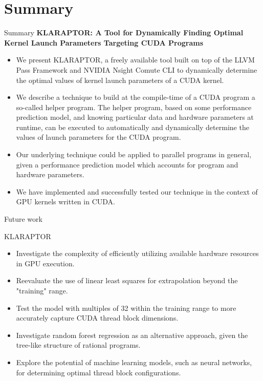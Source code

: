 \section{Summary}
\begin{frame}{Summary}
	\textbf{KLARAPTOR: A Tool for Dynamically Finding Optimal Kernel
		Launch Parameters Targeting CUDA Programs}
	\begin{itemize}
	\item We present KLARAPTOR, a freely available tool built on top
	of the LLVM Pass Framework and NVIDIA Nsight Comute CLI to dynamically determine the optimal values of kernel launch parameters of
	a CUDA kernel. 
	\item We describe a technique to build at the compile-time of a CUDA program a so-called helper program. The helper
	program, based on some performance prediction model, and knowing particular data and hardware parameters at runtime, can be
	executed to automatically and dynamically determine the values
	of launch parameters for the CUDA program. 
	\item Our underlying technique could be applied to
	parallel programs in general, given a performance prediction model
	which accounts for program and hardware parameters. 
	\item We have implemented and successfully tested our technique in the context
	of GPU kernels written in CUDA.
\end{itemize}
\end{frame}

\begin{frame}{Future work}
	\begin{block}{KLARAPTOR}
		\begin{itemize}
			\item Investigate the complexity of efficiently utilizing available hardware resources in GPU execution.
			\item Reevaluate the use of linear least squares for extrapolation beyond the "training" range.
            \item Test the model with multiples of 32 within the training range to more accurately capture CUDA thread block dimensions.
            \item Investigate random forest regression as an alternative approach, given the tree-like structure of rational programs.
            \item Explore the potential of machine learning models, such as neural networks, for determining optimal thread block configurations.
		\end{itemize}
	\end{block}
\end{frame}